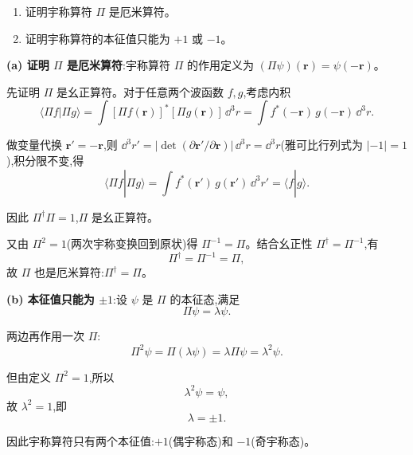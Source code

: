 \begin{question}
\begin{enumerate}
\item 证明宇称算符 $\Pi$ 是厄米算符。
\item 证明宇称算符的本征值只能为 $+1$ 或 $-1$。
\end{enumerate}
\begin{solution}
	\textbf{(a) 证明 $\Pi$ 是厄米算符}:宇称算符 $\Pi$ 的作用定义为 $(\Pi\psi)(\mathbf r)=\psi(-\mathbf r)$。

	先证明 $\Pi$ 是幺正算符。对于任意两个波函数 $f,g$,考虑内积
	\[
	\langle \Pi f|\Pi g\rangle=\int [\Pi f(\mathbf r)]^* [\Pi g(\mathbf r)]\,\dd^3 r
	=\int f^*(-\mathbf r)\,g(-\mathbf r)\,\dd^3 r.
	\]

	做变量代换 $\mathbf r'=-\mathbf r$,则 $\dd^3 r' = |\det(\partial\mathbf r'/\partial\mathbf r)|\,\dd^3 r = \dd^3 r$(雅可比行列式为 $|-1|=1$),积分限不变,得
	\[
	\langle \Pi f|\Pi g\rangle = \int f^*(\mathbf r')\,g(\mathbf r')\,\dd^3 r' = \langle f|g\rangle.
	\]

	因此 $\Pi^\dagger\Pi = 1$,$\Pi$ 是幺正算符。

	又由 $\Pi^2=1$(两次宇称变换回到原状)得 $\Pi^{-1}=\Pi$。结合幺正性 $\Pi^\dagger=\Pi^{-1}$,有
	\[
	\Pi^\dagger = \Pi^{-1} = \Pi,
	\]
	故 $\Pi$ 也是厄米算符:$\boxed{\Pi^\dagger = \Pi}$。

	\textbf{(b) 本征值只能为 $\pm1$}:设 $\psi$ 是 $\Pi$ 的本征态,满足
	\[
	\Pi\psi = \lambda\psi.
	\]

	两边再作用一次 $\Pi$:
	\[
	\Pi^2\psi = \Pi(\lambda\psi) = \lambda\Pi\psi = \lambda^2\psi.
	\]

	但由定义 $\Pi^2=1$,所以
	\[
	\lambda^2\psi = \psi,
	\]
	故 $\lambda^2=1$,即
	\[
	\boxed{\lambda = \pm 1}.
	\]

	因此宇称算符只有两个本征值:$+1$(偶宇称态)和 $-1$(奇宇称态)。
	\end{solution}
\end{question}

